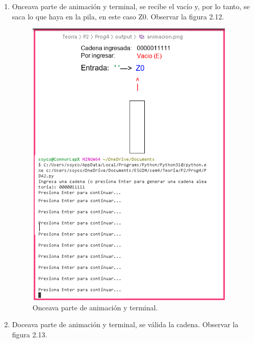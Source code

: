 \begin{enumerate}
\newpage
\item Onceava parte de animación y terminal, se recibe el vacío y, por lo tanto, se saca lo que haya en la pila, en este caso Z0. Observar la figura 2.12.

\begin{figure}[h]
    \begin{center}
    \includegraphics[width=0.6\linewidth]{Images/Cap12.png}
    \end{center}
\caption{Onceava parte de animación y terminal.}
\label{fig:imagen}
\end{figure}

\newpage
\item Doceava parte de animación y terminal, se válida la cadena. Observar la figura 2.13.


\end{enumerate}
